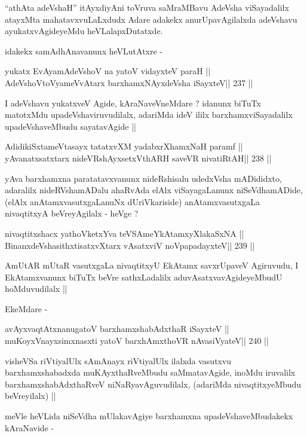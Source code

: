 \begin{artha}
``athAta adeVshaH'' itAyxdiyAni toVruva saMraMBavu AdeVsha
  viSayadalilx atayxMta mahatavxvuLaLxdudx Adare adakekx
  anurUpavAgilalxda adeVshavu ayukatxvAgideyeMdu heVLalapxDutatxde.

idakekx samAdhAnavanunx heVLutAtxre -
\end{artha}

\begin{shl}
yukatx EvAyamAdeVshoV na yatoV vidayxteV paraH ||
AdeVshoV\s toV\s yameVvAtarx barxhamxNAyxdeVsha iSayxteV\hfill || 237 ||
\end{shl}

\begin{artha}
I adeVshavu yukatxveV Agide, kAraNaveVneMdare ? idanunx biTuTx
matotxMdu upadeVshaviruvudilalx, adariMda ideV ililx
barxhamxviSayadalilx upadeVshaveMbudu sayatavAgide ||
\end{artha}

\begin{shl}
AdidikiSxtameVtasayx tatatxvXM yadabxrXhamxNaH paramf ||
yAvanatxsatxtarx nideVRshAyxsetxV\s thARH saveVR nivatiRtAH\hfill || 238 ||
\end{shl}

\begin{artha}
yAva barxhamxna paratatavxvanunx nideRshisalu udedxVsha mADididxto,
adaralilx nideRVshamADalu ahaRvAda elAlx viSayagaLanunx
niSeVdhamADide, (elAlx anAtamxvasutxgaLanuNx dUriVkariside)
anAtamxvasutxgaLa nivaqtitxyA beVreyAgilalx - heVge ?
\end{artha}

\begin{shl}
nivaqtitxshacx yathoVketxYva teVSAmeYkAtamxyXlakaSxNA ||
BinanxdeVshasithxtisatxvXtarx vAsatxviV noVpapadayxteV\hfill || 239 ||
\end{shl}

\begin{artha}
AmUtAR mUtaR vasutxgaLa nivaqtitxyU EkAtamx savxrUpaveV Agiruvudu, I
EkAtamxvanunx biTuTx beVre sathxLadalilx aduvAsatxvavAgideyeMbudU
hoMduvudilalx ||

EkeMdare -
\end{artha}

\begin{shl}
avAyxvaqtAtxnanugatoV barxhamxshabAdxthaR iSayxteV ||
muKoyxV\s nayxsimxnasxti yatoV barxhAmxthoVR nAvasiVyateV\hfill || 240 ||
\end{shl}

\begin{artha}
visheVSa riVtiyalUlx sAmAnayx riVtiyalUlx ilalxda vasutxvu
barxhamxshabadxda muKAyxthaRveMbudu saMmatavAgide, inoMdu iruvalilx
barxhamxshabAdxthaRveV niNaRyavAguvudilalx, (adariMda nivaqtitxyeMbudu
beVreyilalx) ||

meVle heVLida niSeVdha mUlakavAgiye barxhamxna upadeVshaveMbudakekx
kAraNavide -
\end{artha}

